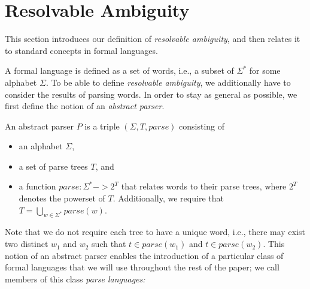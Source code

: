 \documentclass[runningheads]{llncs}
\newcommand{\T}{\Sigma} %
\newcommand{\parse}{\mathit{parse}} %
\newcommand{\regex}{\mathit{Reg}}
\begin{document}



\section{Resolvable Ambiguity} \label{sec:resolvable-definition}

This section introduces our definition of \emph{resolvable ambiguity}, and then relates it to standard concepts in formal languages.

A formal language is defined as a set of words, i.e., a subset of $\T^{*}$ for some alphabet $\T$. To be able to define \emph{resolvable ambiguity}, we additionally have to consider the results of parsing words. In order to stay as general as possible, we first define the notion of an \emph{abstract parser}.

\begin{definition}
  An abstract parser $P$ is a triple $(\T, T, \parse)$ consisting of
\begin{itemize}
\item an alphabet $\T$,
\item a set of parse trees $T$, and
\item a function $\parse : \T^{*} -> 2^T$ that relates words to their parse trees, where $2^T$ denotes the powerset of $T$. Additionally, we require that $T = \bigcup_{w \in \T^{*}} \parse(w)$.
\end{itemize}
\end{definition}

\noindent Note that we do not require each tree to have a unique word, i.e., there may exist two distinct $w_1$ and $w_2$ such that $t \in \parse(w_1)$ and $t \in \parse(w_2)$. This notion of an abstract parser enables the introduction of a particular class of formal languages that we will use throughout the rest of the paper; we call members of this class \emph{parse languages:}
\end{document}
